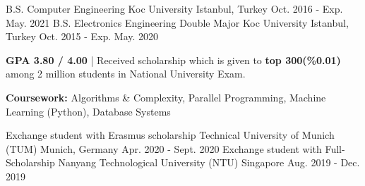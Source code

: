 \begin{cventries}

\cventry
    {B.S. Computer Engineering} %
    {Koc University } %
    {Istanbul, Turkey} %
    {Oct. 2016 - Exp. May. 2021} %
    {}
\vspace{-4mm}
\cventry
    {B.S. Electronics Engineering Double Major} %
    {Koc University } %
    {Istanbul, Turkey} %
    {Oct. 2015 - Exp. May. 2020} %
    {
      \begin{cvitems} %
        \item {\textbf{GPA 3.80 / 4.00} | Received scholarship which is given to \textbf{top 300(\%0.01)} among 2 million students in National University Exam.}
        \item {\textbf{Coursework:} Algorithms \& Complexity, Parallel Programming, Machine Learning (Python), Database Systems}
      \end{cvitems}
    }
\cventry
    {Exchange student with Erasmus scholarship }
    {Technical University of Munich (TUM)} %
    {Munich, Germany} %
    {Apr. 2020 - Sept. 2020} %
    {}
\vspace{-2mm}
\cventry
    {Exchange student with Full-Scholarship}
    {Nanyang Technological University (NTU)} %
    {Singapore} %
    {Aug. 2019 - Dec. 2019} %
    {}
\vspace{2mm}    
\end{cventries}
